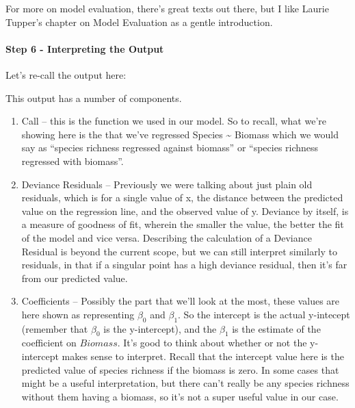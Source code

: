 \documentclass[
]{article}
\begin{document}
For more on model evaluation, there's great texts out there, but I like
Laurie Tupper's chapter on Model Evaluation as a gentle introduction.

\hypertarget{step-6---interpreting-the-output}{%
\paragraph{Step 6 - Interpreting the
Output}\label{step-6---interpreting-the-output}}

Let's re-call the output here:

This output has a number of components.

\begin{enumerate}
\def\labelenumi{\arabic{enumi}.}
\item
  Call -- this is the function we used in our model. So to recall, what
  we're showing here is the that we've regressed Species
  \textasciitilde{} Biomass which we would say as ``species richness
  regressed against biomass'' or ``species richness regressed with
  biomass''.
\item
  Deviance Residuals -- Previously we were talking about just plain old
  residuals, which is for a single value of x, the distance between the
  predicted value on the regression line, and the observed value of y.
  Deviance by itself, is a measure of goodness of fit, wherein the
  smaller the value, the better the fit of the model and vice versa.
  Describing the calculation of a Deviance Residual is beyond the
  current scope, but we can still interpret similarly to residuals, in
  that if a singular point has a high deviance residual, then it's far
  from our predicted value.
\item
  Coefficients -- Possibly the part that we'll look at the most, these
  values are here shown as representing \(\beta_0\) and \(\beta_1\). So
  the intercept is the actual y-intecept (remember that \(\beta_0\) is
  the y-intercept), and the \(\beta_1\) is the estimate of the
  coefficient on \(Biomass\). It's good to think about whether or not
  the y-intercept makes sense to interpret. Recall that the intercept
  value here is the predicted value of species richness if the biomass
  is zero. In some cases that might be a useful interpretation, but
  there can't really be any species richness without them having a
  biomass, so it's not a super useful value in our case.
\end{enumerate}
\end{document}
